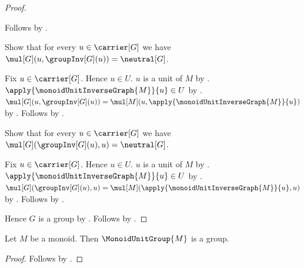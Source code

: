 \begin{proof}
\begin{subproof}
        Follows by .
    \end{subproof}
    Show that for every $u\in\carrier[G]$ we have
        $\mul[G](u,\groupInv[G](u))=\neutral[G]$.
    \begin{subproof}
        Fix $u\in\carrier[G]$.
        Hence $u\in U$.
        $u$ is a unit of $M$ by .
        $\apply{\monoidUnitInverseGraph{M}}{u}\in U$ by
            .
        $\mul[G](u,\groupInv[G](u))=
            \mul[M](u,\apply{\monoidUnitInverseGraph{M}}{u})$ by
            .
        Follows by
            .
    \end{subproof}
    Show that for every $u\in\carrier[G]$ we have
        $\mul[G](\groupInv[G](u),u)=\neutral[G]$.
    \begin{subproof}
        Fix $u\in\carrier[G]$.
        Hence $u\in U$.
        $u$ is a unit of $M$ by .
        $\apply{\monoidUnitInverseGraph{M}}{u}\in U$ by
            .
        $\mul[G](\groupInv[G](u),u)=
            \mul[M](\apply{\monoidUnitInverseGraph{M}}{u},u)$ by
            .
        Follows by
            .
    \end{subproof}
    Hence $G$ is a group by
        .
    Follows by
        .
\end{proof}

\begin{corollary}\label{monoid_unit_group_is_group}
    Let $M$ be a monoid.
    Then $\MonoidUnitGroup{M}$ is a group.
\end{corollary}
\begin{proof}
    Follows by .
\end{proof}
